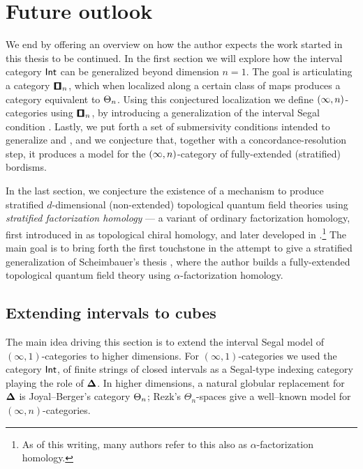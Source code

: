 \cleardoublepage
\chapter{Future outlook}

We end by offering an overview on how the author expects the work started in this thesis to be continued. In the first section we will explore how the interval category $\operatorname{\mathsf{Int}}$ can be generalized beyond dimension $n=1$. The goal is articulating a category $\cube_n$, which when localized along a certain class of maps produces a category equivalent to $\operatorname{\boldsymbol{\Theta}}_n$. Using this conjectured localization we define $(\operatorname{\infty},n)$-categories using $\cube_n$, by introducing a generalization of the interval Segal condition . Lastly, we put forth a set of submersivity conditions intended to generalize  and , and we conjecture that, together with a concordance-resolution step, it produces a model for the $(\operatorname{\infty},n)$-category of fully-extended (stratified) bordisms.

In the last section, we conjecture the existence of a mechanism to produce stratified $d$-dimensional (non-extended) topological quantum field theories using \emph{stratified factorization homology} — a variant of ordinary factorization homology, first introduced in \cite{LurieHA} as topological chiral homology, and later developed in \cite{AFT1}.\footnote{As of this writing, many authors refer to this also as $\alpha$-factorization homology.} The main goal is to bring forth the first touchstone in the attempt to give a stratified generalization of Scheimbauer's thesis \cite{Sch14}, where the author builds a fully-extended topological quantum field theory using $\alpha$-factorization homology. 

\section{Extending intervals to cubes}

The main idea driving this section is to extend the interval Segal model of \((\infty,1)\)-categories to higher dimensions.  For \((\infty,1)\)-categories we used the category \(\operatorname{\mathsf{Int}}\), of finite strings of closed intervals as a Segal-type indexing category playing the role of \(\mathbf\Delta\).  In higher dimensions, a natural globular replacement for \(\mathbf\Delta\) is Joyal–Berger’s category \(\operatorname{\boldsymbol{\Theta}}_n\); Rezk’s \(\Theta_n\)-spaces give a well–known model for
\((\infty,n)\)-categories.

